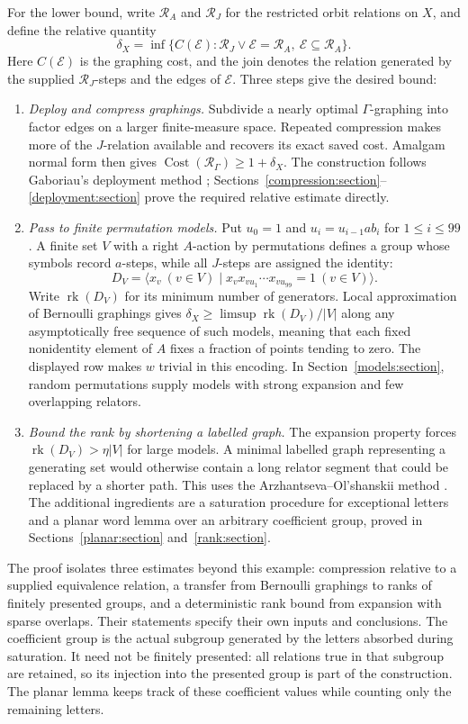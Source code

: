 For the lower bound, write $\mathcal R_A$ and $\mathcal R_J$ for
the restricted orbit relations on $X$, and define the relative
quantity
\[
 \delta_X=\inf\{C(\mathcal E):
       \mathcal R_J\vee\mathcal E=\mathcal R_A,
       \ \mathcal E\subseteq\mathcal R_A\}.
\]
Here $C(\mathcal E)$ is the graphing cost, and the join denotes the
relation generated by the supplied $\mathcal R_J$-steps and the
edges of $\mathcal E$. Three steps give the desired bound:
\begin{enumerate}
\item \emph{Deploy and compress graphings.}
Subdivide a nearly optimal $\Gamma$-graphing into factor edges on a
larger finite-measure space. Repeated compression makes more of the
$J$-relation available and recovers its exact saved cost. Amalgam
normal form then gives
$\operatorname{Cost}(\mathcal R_\Gamma)\ge1+\delta_X$.
The construction follows Gaboriau's deployment method
\cite[\S\,IV.28--IV.32 and Proposition~IV.35]{gaboriau-2000};
Sections~\ref{compression:section}--\ref{deployment:section}
prove the required relative estimate directly.
\item \emph{Pass to finite permutation models.}
Put $u_0=1$ and $u_i=u_{i-1}ab_i$ for $1\le i\le99$. A finite set $V$ with a right
$A$-action by permutations defines a group whose symbols record
$a$-steps, while all $J$-steps are assigned the identity:
\[
 D_V=\langle x_v\ (v\in V)\mid
              x_vx_{vu_1}\cdots x_{vu_{99}}=1\ (v\in V)\rangle.
\]
Write $\operatorname{rk}(D_V)$ for its minimum number of generators.
Local approximation of Bernoulli graphings gives
$\delta_X\ge\limsup\operatorname{rk}(D_V)/|V|$ along any
asymptotically free sequence of such models, meaning that each fixed
nonidentity element of $A$ fixes a fraction of points tending to zero.
The displayed row makes $w$ trivial in this encoding. In
Section~\ref{models:section}, random permutations supply models with
strong expansion and few overlapping relators.
\item \emph{Bound the rank by shortening a labelled graph.}
The expansion property forces
$\operatorname{rk}(D_V)>\eta|V|$ for large models. A minimal
labelled graph representing a generating set would otherwise contain
a long relator segment that could be replaced by a shorter path.
This uses the Arzhantseva--Ol'shanskii method
\cite{arzhantseva-olshanskii-1996,kapovich-schupp-2002}.
The additional ingredients are a saturation procedure for exceptional
letters and a planar word lemma over an arbitrary coefficient group,
proved in Sections~\ref{planar:section} and~\ref{rank:section}.
\end{enumerate}

The proof isolates three estimates beyond this example: compression
relative to a supplied equivalence relation, a transfer from Bernoulli
graphings to ranks of finitely presented groups, and a deterministic
rank bound from expansion with sparse overlaps. Their statements
specify their own inputs and conclusions. The coefficient group is the actual subgroup generated by the letters
absorbed during saturation. It need not be finitely presented: all
relations true in that subgroup are retained, so its injection into the
presented group is part of the construction. The planar lemma keeps
track of these coefficient values while counting only the remaining
letters.
